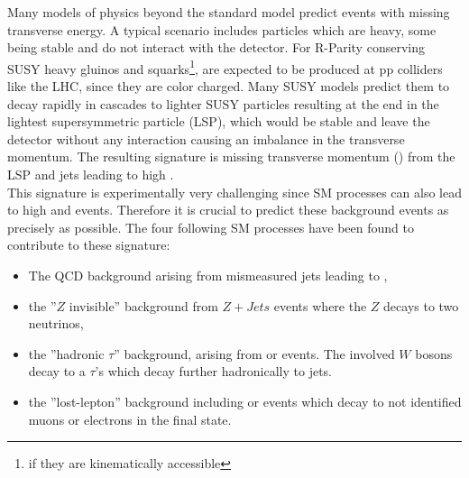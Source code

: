 Many models of physics beyond the standard model predict events with missing transverse energy. A typical scenario includes particles which are heavy, some being stable and do not interact with the detector. 
For R-Parity conserving SUSY heavy gluinos and squarks\footnote{if they are kinematically accessible}, are expected to be produced at pp colliders like the LHC, since they are color charged. Many SUSY models predict them to decay rapidly in cascades to lighter SUSY particles resulting at the end in the lightest supersymmetric particle (LSP), which would be stable and leave the detector without any interaction causing an imbalance in the transverse momentum. The resulting signature is missing transverse momentum (\MHT) from the LSP and jets leading to high \HT.\\%
This signature is experimentally very challenging since SM processes can also lead to high \HT and \MHT events. Therefore it is crucial to predict these background events as precisely as possible. 
The four following SM processes have been found to contribute to these signature:
\begin{itemize}
 \item The QCD background arising from mismeasured jets leading to \MHT,
 \item the ''$Z$ invisible'' background from $Z+Jets$ events where the $Z$ decays to two neutrinos,
 \item the ''hadronic $\tau$'' background, arising from \wpj or \ttbar events. The involved $W$ bosons decay to a $\tau$'s which decay further hadronically to jets.  
 \item the ''lost-lepton'' background including \wpj or \ttbar events which decay to not identified muons or electrons in the final state.
\end{itemize}
